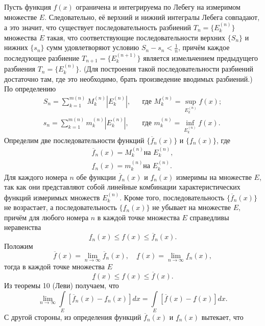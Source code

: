 \documentclass[12pt,a4paper, titlepage]{article}
\begin{document}
Пусть функция $f(x)$ ограничена и интегрируема по Лебегу на измеримом множестве $E$. Следовательно, её верхний и нижний интегралы Лебега совпадают, а это значит, что существует последовательность разбиений $T_n = \lbrace E_k^{(n)} \rbrace$ множества $E$ такая, что соответствующие последовательности верхних $\lbrace S_n \rbrace$ и нижних $\lbrace s_n \rbrace$ сумм удовлетворяют условию $S_n - s_n < \frac 1 n$, причём каждое последующее разбиение $T_{n+1} = \lbrace E_k^{(n+1)} \rbrace$ является измельчением предыдущего разбиения $T_n = \lbrace E_k^{(n)} \rbrace$. (Для построения такой последовательности разбиений достаточно там, где это необходимо, брать произведение вводимых разбиений.)\\

По определению
$$
\begin{matrix}
S_n = \sum\limits_{k=1}^{m(n)} M_k^{(n)} |E_k^{(n)}|, &&\text{где } M_k^{(n)} = \sup\limits_{E_k^{(n)}} f(x); \\
s_n = \sum\limits_{k=1}^{m(n)} m_k^{(n)} |E_k^{(n)}|, &&\text{где } m_k^{(n)} = \inf\limits_{E_k^{(n)}} f(x).
\end{matrix}
$$
Определим две последовательности функций $\lbrace \overline{f}{}_n(x) \rbrace$ и $\lbrace \underline{f}{}_n(x) \rbrace$, где
$$
\begin{matrix}
\overline{f}{}_n(x) = M_k^{(n)} \mbox{на } E_k^{(n)}, \\
\underline{f}{}_n(x) = m_k^{(n)} \mbox{на } E_k^{(n)}.
\end{matrix}
$$
Для каждого номера $n$ обе функции $\overline{f}{}_n(x)$ и $\underline{f}{}_n(x)$ измеримы на множестве $E$, так как они представляют собой линейные комбинации характеристических функций измеримых множеств $E_k^{(n)}$. Кроме того, последовательность $\lbrace \overline{f}{}_n(x) \rbrace$ не возрастает, а последовательность $\lbrace \underline{f}{}_n(x) \rbrace$ не убывает на множестве $E$, причём для любого номера $n$ в каждой точке множества $E$ справедливы неравенства
$$
\underline{f}{}_n(x) \leqslant f(x) \leqslant \overline{f}{}_n(x).
$$
Положим
$$
\overline{f}(x) = \lim_{n\to\infty} \overline{f}{}_n(x), \quad \underline{f}(x) = \lim_{n\to\infty} \underline{f}{}_n(x),
$$
тогда в каждой точке множества $E$
$$
\underline{f}(x) \leqslant f(x) \leqslant \overline{f}(x).
$$
Из теоремы 10 (Леви) получаем, что
$$
\lim_{n\to\infty} \int\limits_E [\overline{f}{}_n(x) - \underline{f}{}_n(x)] dx = \int\limits_E [\overline{f}(x) - \underline{f}(x)] dx.
$$
С другой стороны, из определения функций $\overline{f}{}_n(x)$ и $\underline{f}{}_n(x)$ вытекает, что
\end{document}
